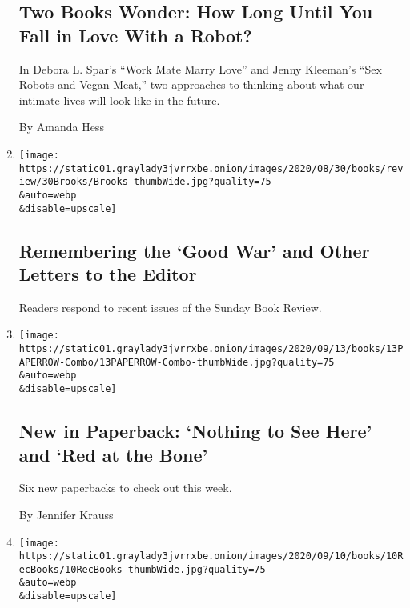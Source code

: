 \begin{enumerate}
  \hypertarget{two-books-wonder-how-long-until-you-fall-in-love-with-a-robot}{%
  \subsection{Two Books Wonder: How Long Until You Fall in Love With a
  Robot?}\label{two-books-wonder-how-long-until-you-fall-in-love-with-a-robot}}

  In Debora L. Spar's ``Work Mate Marry Love'' and Jenny Kleeman's ``Sex
  Robots and Vegan Meat,'' two approaches to thinking about what our
  intimate lives will look like in the future.

  By Amanda Hess
\item
  \href{/2020/09/11/books/review/remembering-the-good-war-and-other-letters-to-the-editor.html}{}

  \texttt{[image: https://static01.graylady3jvrrxbe.onion/images/2020/08/30/books/review/30Brooks/Brooks-thumbWide.jpg?quality=75\\\&auto=webp\\\&disable=upscale]}

  \hypertarget{remembering-the-good-war-and-other-letters-to-the-editor}{%
  \subsection{Remembering the `Good War' and Other Letters to the
  Editor}\label{remembering-the-good-war-and-other-letters-to-the-editor}}

  Readers respond to recent issues of the Sunday Book Review.
\item
  \href{/2020/09/11/books/review/new-paperbacks.html}{}

  \texttt{[image: https://static01.graylady3jvrrxbe.onion/images/2020/09/13/books/13PAPERROW-Combo/13PAPERROW-Combo-thumbWide.jpg?quality=75\\\&auto=webp\\\&disable=upscale]}

  \hypertarget{new-in-paperback-nothing-to-see-here-and-red-at-the-bone}{%
  \subsection{New in Paperback: `Nothing to See Here' and `Red at the
  Bone'}\label{new-in-paperback-nothing-to-see-here-and-red-at-the-bone}}

  Six new paperbacks to check out this week.

  By Jennifer Krauss
\item
  \href{/2020/09/10/books/review/9-new-books-we-recommend-this-week.html}{}

  \texttt{[image: https://static01.graylady3jvrrxbe.onion/images/2020/09/10/books/10RecBooks/10RecBooks-thumbWide.jpg?quality=75\\\&auto=webp\\\&disable=upscale]}


\end{enumerate}
